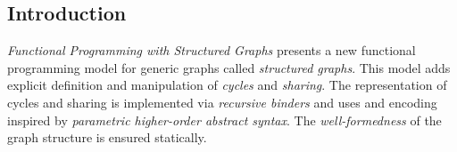 \subsection{Introduction}\label{subsec:intro}

\textit{Functional Programming with Structured Graphs} presents a new functional programming model for generic graphs called \textit{structured graphs}. This model adds explicit definition and manipulation of \textit{cycles} and \textit{sharing}. The representation of cycles and sharing is implemented via \textit{recursive binders} and uses and encoding inspired by \textit{parametric higher-order abstract syntax}. The \textit{well-formedness} of the graph structure is ensured statically.





